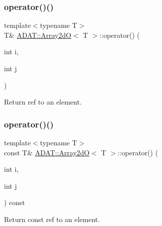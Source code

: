 \subsubsection{\texorpdfstring{operator()()}{operator()()}\hspace{0.1cm}{\footnotesize\ttfamily [2/4]}}
{\footnotesize\ttfamily template$<$typename T$>$ \\
T\& \mbox{\hyperlink{classADAT_1_1Array2dO}{A\+D\+A\+T\+::\+Array2dO}}$<$ T $>$\+::operator() (\begin{DoxyParamCaption}\item[{int}]{i,  }\item[{int}]{j }\end{DoxyParamCaption})\hspace{0.3cm}{\ttfamily [inline]}}



Return ref to an element. 

\mbox{\label{classADAT_1_1Array2dO_a3093245fdc65b66ac6d410d66feb2020}} 
\subsubsection{\texorpdfstring{operator()()}{operator()()}\hspace{0.1cm}{\footnotesize\ttfamily [3/4]}}
{\footnotesize\ttfamily template$<$typename T$>$ \\
const T\& \mbox{\hyperlink{classADAT_1_1Array2dO}{A\+D\+A\+T\+::\+Array2dO}}$<$ T $>$\+::operator() (\begin{DoxyParamCaption}\item[{int}]{i,  }\item[{int}]{j }\end{DoxyParamCaption}) const\hspace{0.3cm}{\ttfamily [inline]}}



Return const ref to an element. 

\mbox{\label{classADAT_1_1Array2dO_a3093245fdc65b66ac6d410d66feb2020}} 
